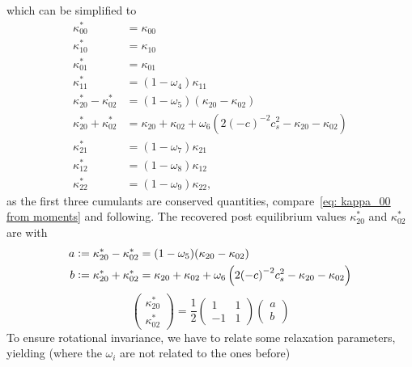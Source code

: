 \documentclass{article}
\begin{document}
which can be simplified to
\begin{equation}
  \begin{aligned}
    \kappa_{00}^{*} & = \kappa_{00} \\
    \kappa_{10}^{*} & = \kappa_{10} \\
    \kappa_{01}^{*} & = \kappa_{01} \\
    \kappa_{11}^{*} & = (1-\omega_4)\kappa_{11} \\
    \kappa_{20}^{*} - \kappa_{02}^{*}
      & = (1-\omega_5) (\kappa_{20} - \kappa_{02}) \\
    \kappa_{20}^{*} + \kappa_{02}^{*}
      & = \kappa_{20} + \kappa_{02} + \omega_6 \left( 2 {(-c)}^{-2} c_s^2 - \kappa_{20} - \kappa_{02} \right) \\
    \kappa_{21}^{*} & = (1-\omega_7)\kappa_{21} \\
    \kappa_{12}^{*} & = (1-\omega_8)\kappa_{12} \\
    \kappa_{22}^{*} & = (1-\omega_9)\kappa_{22},
  \end{aligned}
\end{equation}
as the first three cumulants are conserved quantities, compare~\eqref{eq: kappa_00 from moments} and following.
%
The recovered post equilibrium values $\kappa_{20}^{*}$ and $\kappa_{02}^{*}$ are with
\begin{equation}
  \begin{aligned}
    a \mathrel{\mathop:}= \kappa_{20}^{*} - \kappa_{02}^{*}
      & = (1-\omega_5) (\kappa_{20} - \kappa_{02}) \\
    b \mathrel{\mathop:}= \kappa_{20}^{*} + \kappa_{02}^{*}
      & = \kappa_{20} + \kappa_{02} + \omega_6 \left( 2 {(-c)}^{-2} c_s^2 - \kappa_{20} - \kappa_{02} \right)
  \end{aligned}
\end{equation}
\begin{equation}
  \begin{pmatrix}
    \kappa_{20}^{*} \\
    \kappa_{02}^{*}
  \end{pmatrix}
  = \frac{1}{2}
  \begin{pmatrix}
    1 & 1 \\ -1 & 1
  \end{pmatrix}
  \begin{pmatrix}
    a\\
    b
  \end{pmatrix}
\end{equation}
To ensure rotational invariance, we have to relate some relaxation parameters, yielding (where the $\omega_i$ are not related to the ones before)
\end{document}

